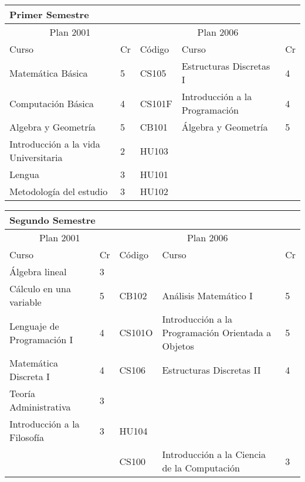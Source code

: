 \begin{center}
\begin{tabularx}{0.95\textwidth}{|p{4cm}|p{1cm}||p{2cm}|X|p{1cm}|}\hline
\multicolumn{5}{|l|}{\textbf{Primer Semestre}} \\ \hline
\multicolumn{2}{|c|}{Plan 2001} & \multicolumn{3}{|c|}{Plan 2006} \\ \hline
Curso & Cr & Código & Curso & Cr \\ \hline
Matemática Básica & 5 & CS105 & Estructuras Discretas I & 4 \\ \hline
Computación Básica & 4 & CS101F & Introducción a la Programación & 4 \\ \hline
Algebra y Geometría & 5 & CB101 & Álgebra y Geometría & 5 \\ \hline
Introducción a la vida Universitaria & 2 & HU103 &  & \\ \hline
Lengua & 3 & HU101 &  & \\ \hline
Metodología del estudio & 3 & HU102 &  & \\ \hline
\end{tabularx}
\end{center}

\begin{center}
\begin{tabularx}{0.95\textwidth}{|p{4cm}|p{1cm}||p{2cm}|X|p{1cm}|}\hline
\multicolumn{5}{|l|}{\textbf{Segundo Semestre}} \\ \hline
\multicolumn{2}{|c|}{Plan 2001} & \multicolumn{3}{|c|}{Plan 2006} \\ \hline
Curso & Cr & Código & Curso & Cr \\ \hline
Álgebra lineal & 3 &  &  & \\ \hline
Cálculo en una variable & 5 & CB102 & Análisis Matemático I & 5 \\ \hline
Lenguaje de Programación I & 4 & CS101O & Introducción a la Programación Orientada a Objetos & 5 \\ \hline
Matemática Discreta I & 4 & CS106 & Estructuras Discretas II & 4 \\ \hline
Teoría Administrativa & 3 &  &  & \\ \hline
Introducción a la Filosofía & 3 & HU104 &  & \\ \hline
 &  & CS100 & Introducción a la Ciencia de la Computación & 3 \\ \hline
\end{tabularx}
\end{center}

